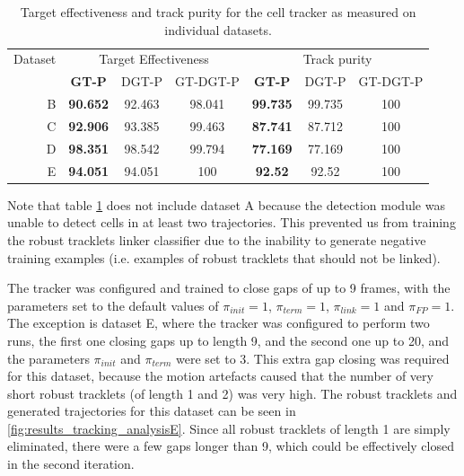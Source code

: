 		\begin{table}[h]
			\centering
			\begin{tabular}{r*{3}{c}*{3}{c}}
				Dataset & \multicolumn{3}{c}{Target Effectiveness} &  \multicolumn{3}{c}{Track purity}   \\
				        &  \textbf{GT-P}  & DGT-P  &   GT-DGT-P    &  \textbf{GT-P}  & DGT-P  & GT-DGT-P \\
			\hline
				      B & \textbf{90.652} & 92.463 &    98.041     & \textbf{99.735} & 99.735 &   100    \\
				      C & \textbf{92.906} & 93.385 &    99.463     & \textbf{87.741} & 87.712 &   100    \\
				      D & \textbf{98.351} & 98.542 &    99.794     & \textbf{77.169} & 77.169 &   100    \\
				      E & \textbf{94.051} & 94.051 &      100      & \textbf{ 92.52} & 92.52  &   100
			\end{tabular} 
			\caption{Target effectiveness and track purity for the cell tracker as measured on individual datasets.}
			\label{tab:results_tracker_individual}
		\end{table}
		
		Note that table \cref{tab:results_tracker_individual} does not include dataset A because the detection module was unable to detect cells in at least two trajectories. This prevented us from training the robust tracklets linker classifier due to the inability to generate negative training examples (i.e. examples of robust tracklets that should not be linked).
		
		The tracker was configured and trained to close gaps of up to 9 frames, with the parameters set to the default values of $\pi_{init}=1$, $\pi_{term}=1$, $\pi_{link}=1$ and $\pi_{FP}=1$. The exception is dataset E, where the tracker was configured to perform two runs, the first one closing gaps up to length 9, and the second one up to 20, and the parameters $\pi_{init}$ and $\pi_{term}$ were set to 3. This extra gap closing was required for this dataset, because the motion artefacts caused that the number of very short robust tracklets (of length 1 and 2) was very high. The robust tracklets and generated trajectories for this dataset can be seen in \cref{fig:results_tracking_analysisE}. Since all robust tracklets of length 1 are simply eliminated, there were a few gaps longer than 9, which could be effectively closed in the second iteration.
		
